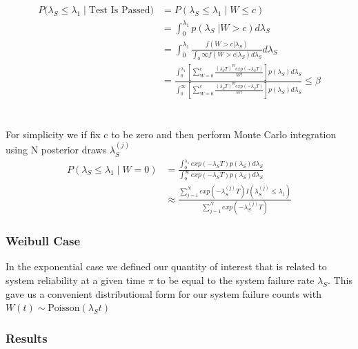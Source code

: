 \documentclass[12pt]{article}
\begin{document}
$$
\begin{aligned}
    P(\lambda_S \leq \lambda_1 \; \vert \; \text{Test Is Passed)} &= P(\lambda_S \leq \lambda_1 \; \vert \; W \leq c) \\
	&= \int_{0}^{\lambda_1} p(\lambda_S \; \vert W > c) d\lambda_S \\
    &= \int_{0}^{\lambda_1} \frac{f(W > c \vert \lambda_S)}{\int_{0}{\infty} f(W > c \vert \lambda_S) d\lambda_S} d\lambda_S \\
    &= \frac{\int_{0}^{\lambda_1} [ \sum_{W=0}^c \frac{(\lambda_S T)^W exp(-\lambda_S T)}{W!}]p(\lambda_S)d\lambda_S} {\int_{0}^{\infty} [ \sum_{W=0}^c \frac{(\lambda_S T)^W exp(-\lambda_S T)}{W!}]p(\lambda_S)d\lambda_S} \leq \beta
\end{aligned}
$$
\\
\\
For simplicity we if fix c to be zero and then perform Monte Carlo integration using N posterior draws $ \lambda_S^{(j)} $
$$
\begin{aligned}
	 P(\lambda_S \leq \lambda_1 \; \vert \; W = 0) &= \frac{\int_{0}^{\lambda_1} exp(-\lambda_S T)p(\lambda_S)d\lambda_S} {\int_{0}^{\infty} exp(-\lambda_S T)p(\lambda_S)d\lambda_S} \\
     &\approx \frac{\sum_{j = 1}^{N} exp(-\lambda_S^{(j)} T)I(\lambda_S^{(j)} \leq \lambda_1)} {\sum_{j = 1}^{N} exp(-\lambda_S^{(j)} T)}
\end{aligned}
$$

\subsubsection{Weibull Case}

In the exponential case we defined our quantity of interest that is related to system reliability at
a given time $\pi$ to be equal to the system failure rate $\lambda_S$.  This gave us a convenient distributional form
for our system failure counts with $W(t) \sim \text{Poisson}(\lambda_S t)$

\subsubsection{Results}
\end{document}

